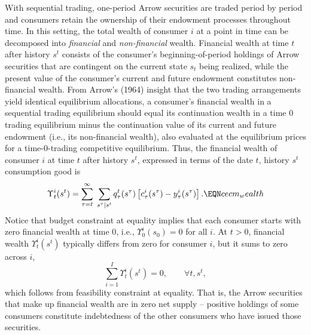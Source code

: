 With sequential trading,   
one-period Arrow securities are traded period by period and  consumers
retain the ownership of their endowment processes throughout time.
In this setting, the total
wealth of consumer $i$ at a point in time can be decomposed into  {\it financial}  and
 {\it non-financial} wealth.
Financial wealth at time $t$ after history $s^t$ consists of the consumer's
beginning-of-period holdings of Arrow securities that are contingent on
the current state $s_t$ being realized,
while the present value of the consumer's current and future endowment constitutes non-financial
wealth. From Arrow's (1964) insight that the two trading arrangements
yield  identical equilibrium allocations, a consumer's financial wealth
in a sequential trading equilibrium should  equal  its
continuation wealth in a time $0$ trading equilibrium minus the continuation value of
its current and future endowment
(i.e., its non-financial wealth), also evaluated at the equilibrium prices for a time-$0$-trading competitive equilibrium. Thus, the
financial wealth of consumer $i$ at time $t$ after history $s^t$,
expressed in terms of the date $t$, history $s^t$ consumption good is
$$
\Upsilon^i_t(s^t) =
\sum_{\tau=t}^\infty \; \sum_{s^\tau \vert s^t}
    q_\tau^t(s^\tau) \left[ c^i_\tau(s^\tau) - y_\tau^i(s^\tau) \right]. \EQN cecm_wealth$$
Notice that budget constraint  at equality implies that
each consumer starts  with zero financial wealth at time $0$, i.e., 
$\Upsilon^i_0(s_0)=0$ for all $i$. At $t >0$, financial wealth
$\Upsilon^i_t(s^t)$ typically differs from zero for consumer $i$,
but it sums to zero across $i$,
$$
\sum_{i=1}^{I}  \Upsilon^i_t(s^t) = 0, \qquad \forall t, s^t,
$$
which follows from feasibility constraint  at equality.
That is, the  Arrow securities that make up financial
wealth are in zero net supply -- positive holdings of some consumers
constitute indebtedness of the other consumers who have issued those
securities.





